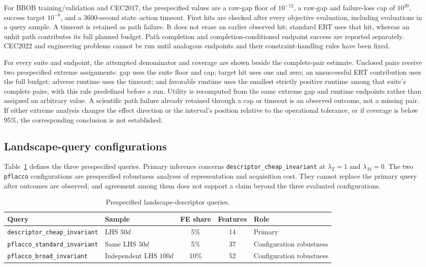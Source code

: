 For BBOB training/validation and CEC2017, the prespecified values are a raw-gap
floor of $10^{-12}$, a raw-gap and failure-loss cap of $10^{20}$, success target
$10^{-8}$, and a 3600-second state--action timeout.  First hits are checked after
every objective evaluation, including evaluations in a query sample.  A timeout
is retained as path failure.  It does not erase an earlier observed hit;
standard ERT uses that hit, whereas an unhit path contributes its full planned
budget.  Path completion and completion-conditioned endpoint success are
reported separately.  CEC2022 and engineering problems cannot be run until
analogous endpoints and their constraint-handling rules have been fixed.

For every suite and endpoint, the attempted denominator and coverage are shown
beside the complete-pair estimate.  Unclosed pairs receive two prespecified
extreme assignments: gap uses the suite floor and cap; target hit uses one and
zero; an unsuccessful ERT contribution uses the full budget; adverse runtime
uses the timeout; and favorable runtime uses the smallest strictly positive
runtime among that suite's complete pairs, with this rule predefined before a run.
Utility is recomputed from the same extreme gap and runtime endpoints rather
than assigned an arbitrary value.  A scientific path failure already retained
through a cap or timeout is an observed outcome, not a missing pair.  If either
extreme analysis changes the effect direction or the interval's position
relative to the operational tolerance, or if coverage is below 95\%, the
corresponding conclusion is not established.

\subsection{Landscape-query configurations}

Table~\ref{tab:query-configurations} defines the three prespecified queries.
Primary inference concerns \texttt{descriptor\_cheap\_invariant} at $\lambda_T=1$ and
$\lambda_M=0$.  The two \texttt{pflacco} configurations are prespecified
robustness analyses of representation and acquisition cost.  They cannot
replace the primary query after outcomes are observed, and agreement among
them does not support a claim beyond the three evaluated configurations.

\begin{table}[t]
  \caption{Prespecified landscape-descriptor queries.}
  \label{tab:query-configurations}
  \centering
  \small
  \begin{tabularx}{\textwidth}{@{}l l c c X@{}}
    \toprule
    Query & Sample & FE share & Features & Role \\
    \midrule
    \texttt{descriptor\_cheap\_invariant} & LHS $50d$ & 5\% & 14 & Primary \\
    \texttt{pflacco\_standard\_invariant} & Same LHS $50d$ & 5\% & 37 & Configuration robustness \\
    \texttt{pflacco\_broad\_invariant} & Independent LHS $100d$ & 10\% & 52 & Configuration robustness \\
    \bottomrule
  \end{tabularx}
\end{table}

